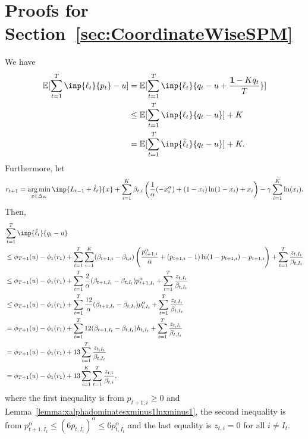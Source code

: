 \section{Proofs for Section~\ref{sec:CoordinateWiseSPM}}
\label{appendix:ProofsForCoordinateWiseSPM}
We have
\begin{align*}
    \E[\sum_{t=1}^T \inp{\ell_t}{p_t} - u] &= \E[\sum_{t=1}^T \inp{\ell_t}{q_t - u + \frac{\1 - Kq_t}{T}}] \\
    &\leq \E[\sum_{t=1}^T \inp{\ell_t}{q_t - u}] + K \\
    &= \E[\sum_{t=1}^T \inp{\hat{\ell}_t}{q_t - u}] + K.
\end{align*}
Furthermore, let
\begin{align*}
    r_{t+1} = \argmin_{x \in \Delta_K} \inp{L_{t-1} + \hat{\ell}_t}{x} + \sum_{i=1}^K \beta_{t,i}\left(\frac{1}{\alpha}(-x_i^\alpha) + (1-x_i)\ln(1-x_i) + x_i \right) - \gamma\sum_{i=1}^K \ln(x_i).
\end{align*}
Then,
\begin{align*}
    &\sum_{t=1}^T \inp{\hat{\ell}_t}{q_t - u} \\
    &\leq \phi_{T+1}(u) - \phi_1(r_1) + \sum_{t=1}^T \sum_{i=1}^K  (\beta_{t+1, i} - \beta_{t,i})\left( \frac{p_{t+1,i}^\alpha}{\alpha} + (p_{t+1,i}-1)\ln(1-p_{t+1,i}) - p_{t+1, i} \right) + \sum_{t=1}^T \frac{z_{t,I_t}}{\beta_{t,I_t}} \\
    &\leq \phi_{T+1}(u) - \phi_1(r_1) + \sum_{t=1}^T \frac{2}{\alpha} (\beta_{t + 1,I_t} - \beta_{t,I_t}) p_{t+1,I_t}^\alpha + \sum_{t=1}^T \frac{z_{t,I_t}}{\beta_{t,I_t}} \\
    &\leq \phi_{T+1}(u) - \phi_1(r_1) + \sum_{t=1}^T \frac{12}{\alpha} (\beta_{t + 1,I_t} - \beta_{t,I_t}) p_{t,I_t}^\alpha + \sum_{t=1}^T \frac{z_{t,I_t}}{\beta_{t,I_t}} \\
    &= \phi_{T+1}(u) - \phi_1(r_1) + \sum_{t=1}^T 12(\beta_{t + 1,I_t} - \beta_{t,I_t}) h_{t,I_t} + \sum_{t=1}^T \frac{z_{t,I_t}}{\beta_{t,I_t}} \\
    &= \phi_{T+1}(u) - \phi_1(r_1) + 13\sum_{t=1}^T \frac{z_{t,I_t}}{\beta_{t,I_t}} \\
    &= \phi_{T+1}(u) - \phi_1(r_1) + 13\sum_{i=1}^K \sum_{t=1}^T  \frac{z_{t,i}}{\beta_{t,i}},
\end{align*}
where the first inequality is from $p_{t+1,i} \geq 0$ and Lemma~\ref{lemma:xalphadominatesxminus1lnxminus1}, the second inequality is from $p_{t+1, I_t}^\alpha \leq (6 p_{t,I_t})^\alpha \leq 6p^\alpha_{t,I_t}$ and the last equality is $z_{t,i} = 0$ for all $i \neq I_t$.


